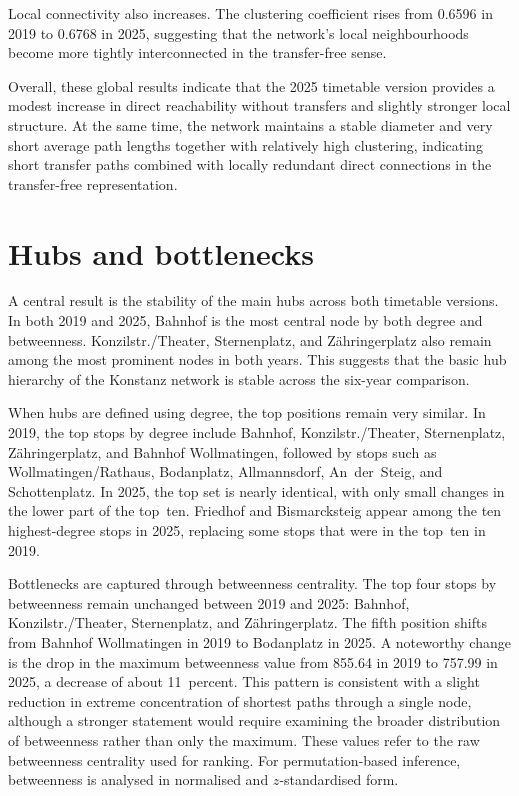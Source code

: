 \documentclass[12pt,a4paper,oneside]{report}
\begin{document}
Local connectivity also increases.
The clustering coefficient rises from 0.6596 in 2019 to 0.6768 in 2025, suggesting that the network's local neighbourhoods become more tightly interconnected in the transfer-free sense.

Overall, these global results indicate that the 2025 timetable version provides a modest increase in direct reachability without transfers and slightly stronger local structure.
At the same time, the network maintains a stable diameter and very short average path lengths together with relatively high clustering, indicating short transfer paths combined with locally redundant direct connections in the transfer-free representation.

\section{Hubs and bottlenecks}\label{sec:hubs-results}

A central result is the stability of the main hubs across both timetable versions.
In both 2019 and 2025, Bahnhof is the most central node by both degree and betweenness.
Konzilstr./Theater, Sternenplatz, and Z\"{a}hringerplatz also remain among the most prominent nodes in both years.
This suggests that the basic hub hierarchy of the Konstanz network is stable across the six-year comparison.

When hubs are defined using degree, the top positions remain very similar.
In 2019, the top stops by degree include Bahnhof, Konzilstr./Theater, Sternenplatz, Z\"{a}hringerplatz, and Bahnhof Wollmatingen, followed by stops such as Wollmatingen/Rathaus, Bodanplatz, Allmannsdorf, An~der~Steig, and Schottenplatz.
In 2025, the top set is nearly identical, with only small changes in the lower part of the top~ten.
Friedhof and Bismarcksteig appear among the ten highest-degree stops in 2025, replacing some stops that were in the top~ten in 2019.

Bottlenecks are captured through betweenness centrality.
The top four stops by betweenness remain unchanged between 2019 and 2025: Bahnhof, Konzilstr./Theater, Sternenplatz, and Z\"{a}hringerplatz.
The fifth position shifts from Bahnhof Wollmatingen in 2019 to Bodanplatz in 2025.
A noteworthy change is the drop in the maximum betweenness value from 855.64 in 2019 to 757.99 in 2025, a decrease of about 11~percent.
This pattern is consistent with a slight reduction in extreme concentration of shortest paths through a single node, although a stronger statement would require examining the broader distribution of betweenness rather than only the maximum.
These values refer to the raw betweenness centrality used for ranking.
For permutation-based inference, betweenness is analysed in normalised and $z$-standardised form.
\end{document}
